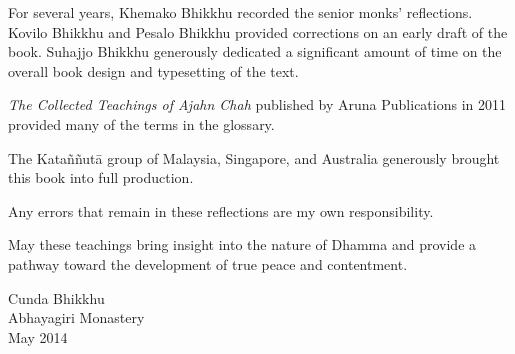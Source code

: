 For several years, Khemako \mbox{Bhikkhu} recorded the senior monks'
reflections. Kovilo \mbox{Bhikkhu} and Pesalo \mbox{Bhikkhu} provided
corrections on an early draft of the book. Suhajjo \mbox{Bhikkhu}
generously dedicated a significant amount of time on the overall book
design and typesetting of the text.


\textit{The Collected Teachings of Ajahn Chah} published by Aruna
Publications in 2011 provided many of the terms in the glossary. 

The Kataññutā group of Malaysia, Singapore, and Australia generously
brought this book into full production.

Any errors that remain in these reflections are my own responsibility.

May these teachings bring insight into the nature of Dhamma and provide
a pathway toward the development of true peace and contentment.

{\raggedleft
Cunda Bhikkhu\\Abhayagiri Monastery\\May 2014

}
